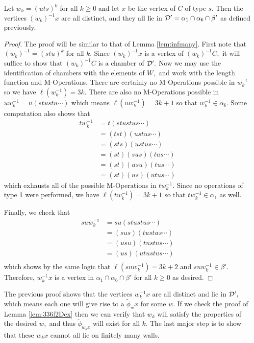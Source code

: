 \documentclass[class=book, crop=false]{standalone}
\begin{document}
\begin{lemma}
	\label{lem:336f2inf}
	Let $w_k=(uts)^k$ for all $k\ge 0$ and let $x$ be the vertex of $C$ of type $s.$ Then the vertices $(w_k)^{-1}x$ are all distinct, and they all lie in $\mathcal{D}'=\alpha_1\cap \alpha_6\cap\beta'$ as defined previously.
\end{lemma}
\begin{proof}
	The proof will be similar to that of Lemma \ref{lem:infmany}. First note that $(w_k)^{-1}=(stu)^k$ for all $k.$ Since $(w_k)^{-1}x$ is a vertex of $(w_k)^{-1}C,$ it will suffice to show that $(w_k)^{-1}C$ is a chamber of $\mathcal{D}'.$ Now we may use the identification of chambers with the elements of $W,$ and work with the length function and M-Operations. There are certainly no M-Operations possible in $w_k^{-1}$ so we have $\ell(w_k^{-1})=3k.$ There are also no M-Operations possible in $uw_k^{-1}=u(stustu\cdots)$ which means $\ell(uw_k^{-1})=3k+1$ so that $w_k^{-1}\in \alpha_6.$ Some computation also shows that
	\begin{align*}
		tw_k^{-1}&=t(stustus\cdots)\\
			 &=(tst)(ustus\cdots)\\
			 &=(sts)(ustus\cdots)\\
			 &=(st)(sus)(tus\cdots)\\
			 &=(st)(usu)(tus\cdots)\\
			 &=(st)(us)(utus\cdots)
	\end{align*}
	which exhausts all of the possible M-Operations in $tw_k^{-1}.$ Since no operations of type 1 were performed, we have $\ell(tw_k^{-1})=3k+1$ so that $tw_k^{-1}\in \alpha_1$ as well.

	Finally, we check that
	\begin{align*}
		suw_k^{-1}&=su(stustus\cdots)\\
			  &=(sus)(tustus\cdots)\\
			  &=(usu)(tustus\cdots)\\
			  &=(us)(utustus\cdots)\\
	\end{align*}
	which shows by the same logic that $\ell(suw_k^{-1})=3k+2$ and $suw_k^{-1}\in \beta'.$ Therefore, $w_k^{-1}x$ is a vertex in $\alpha_1\cap \alpha_6\cap \beta'$ for all $k\ge 0$ as desired.
\end{proof}

The previous proof shows that the vertices $w_k^{-1}x$ are all distinct and lie in $\mathcal{D}',$ which means each one will give rise to a $\tilde{\phi}_wx$ for some $w.$ If we check the proof of Lemma \ref{lem:336f2Dex} then we can verify that $w_k$ will satisfy the properties of the desired $w,$ and thus $\tilde{\phi}_{w_kx}$ will exist for all $k.$ The last major step is to show that these $w_kx$ cannot all lie on finitely many walls.
\end{document}
